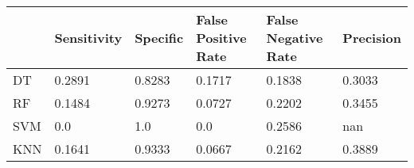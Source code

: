 \begin{table}[!h]
\begin{tabular}{l | l | l| l| l | l}
 & Sensitivity & Specific & False Positive Rate & False Negative Rate & Precision \\\hline
DT & 0.2891 & 0.8283 & 0.1717 & 0.1838 & 0.3033\\
RF & 0.1484 & 0.9273 & 0.0727 & 0.2202 & 0.3455\\
SVM & 0.0 & 1.0 & 0.0 & 0.2586 & nan\\
KNN & 0.1641 & 0.9333 & 0.0667 & 0.2162 & 0.3889\\
\end{tabular}
\caption{}
\end{table}

